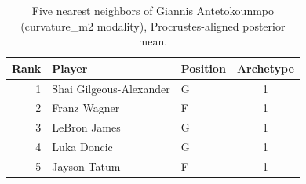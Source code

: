 \begin{table}[htbp]
  \centering\small
  \begin{tabular}{rllc}
    \toprule
    Rank & Player & Position & Archetype \\
    \midrule
    1 & Shai Gilgeous-Alexander & G & 1 \\
    2 & Franz Wagner & F & 1 \\
    3 & LeBron James & G & 1 \\
    4 & Luka Doncic & G & 1 \\
    5 & Jayson Tatum & F & 1 \\
    \bottomrule
  \end{tabular}
  \caption{Five nearest neighbors of Giannis Antetokounmpo (curvature_m2 modality), Procrustes-aligned posterior mean.}
  \label{tab:Giannis_Antetokounmpo_neighbors_curvature_m2}
\end{table}

